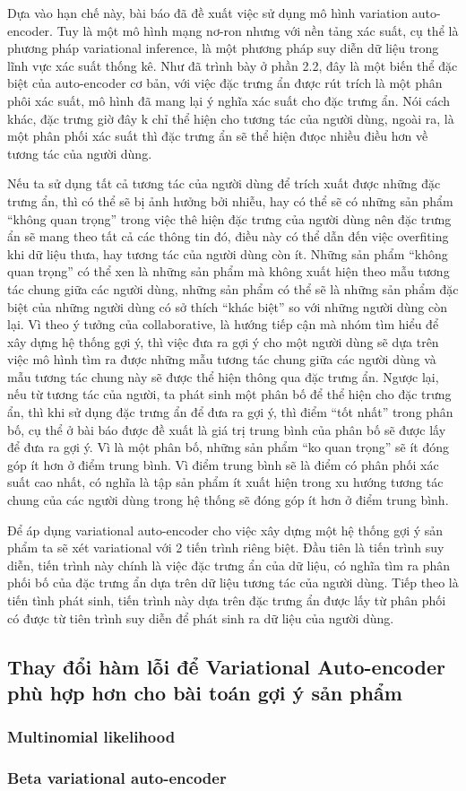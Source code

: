     Dựa vào hạn chế này, bài báo đã đề xuất việc sử dụng mô hình variation auto-encoder. 
    Tuy là một mô hình mạng nơ-ron nhưng với nền tảng xác suất, cụ thể là phương pháp variational inference, là một phương pháp suy diễn dữ liệu trong lĩnh vực xác suất thống kê.
    Như đã trình bày ở phần 2.2, đây là một biến thể đặc biệt của auto-encoder cơ bản, với việc đặc trưng ẩn được rút trích là một phân phôi xác suất, mô hình đã mang lại ý nghĩa xác suất cho đặc trưng ẩn.
    Nói cách khác, đặc trưng giờ đây k chỉ thể hiện cho tương tác của người dùng, ngoài ra, là một phân phối xác suất thì đặc trưng ẩn sẽ thể hiện đưọc nhiều điều hơn về tương tác của người dùng.


    Nếu ta sử dụng tất cả tương tác của người dùng để trích xuất được những đặc trưng ẩn, thì có thể sẽ bị ảnh hưởng bởi nhiễu, hay có thể sẽ có những sản phẩm ``không quan trọng'' trong việc thê hiện đặc trưng của người dùng nên đặc trưng ẩn sẽ mang theo tất cả các thông tin đó, điều này có thể dẫn đến việc overfiting khi dữ liệu thưa, hay tương tác của người dùng còn ít.
    Những sản phẩm ``không quan trọng'' có thể xen là những sản phẩm mà không xuất hiện theo mẫu tương tác chung giữa các người dùng, những sản phẩm có thể sẽ là những sản phẩm đặc biệt của những người dùng có sở thích ``khác biệt'' so với những người dùng còn lại. 
    Vì theo ý tưởng của collaborative, là hướng tiếp cận mà nhóm tìm hiểu để xây dựng hệ thống gợi ý, thì việc đưa ra gợi ý cho một người dùng sẽ dựa trên việc mô hình tìm ra được những mẫu tương tác chung giữa các người dùng và mẫu tương tác chung này sẽ được thể hiện thông qua đặc trưng ẩn.
    Ngược lại, nếu từ tương tác của người, ta phát sinh một phân bố để thể hiện cho đặc trưng ẩn, thì khi sử dụng đặc trưng ẩn để đưa ra gợi ý, thì điểm ``tốt nhất'' trong phân bố, cụ thể ở bài báo được đề xuất là giá trị trung bình của phân bố sẽ được lấy để đưa ra gợi ý.
    Vì là một phân bố, những sản phẩm ``ko quan trọng'' sẽ ít đóng góp ít hơn ở điểm trung bình. Vì điểm trung bình sẽ là điểm có phân phối xác suất cao nhất, có nghĩa là tập sản phẩm ít xuất hiện trong xu hướng tương tác chung của các người dùng trong hệ thống sẽ đóng góp ít hơn ở điểm trung bình.     

    
    Để áp dụng variational auto-encoder cho việc xây dựng một hệ thống gợi ý sản phẩm ta sẽ xét variational với 2 tiến trình riêng biệt. 
    Đầu tiên là tiến trình suy diễn, tiến trình này chính là việc đặc trưng ẩn của dữ liệu, có nghĩa tìm ra phân phối bố của đặc trưng ẩn dựa trên dữ liệu tương tác của người dùng.
    Tiếp theo là tiến tình phát sinh, tiến trình này dựa trên đặc trưng ẩn được lấy từ phân phối có được từ tiên trình suy diễn để phát sinh ra dữ liệu của người dùng.

    

    \subsection{Thay đổi hàm lỗi để Variational Auto-encoder phù hợp hơn cho bài toán gợi ý sản phẩm}

        \subsubsection{Multinomial likelihood}
        \subsubsection{Beta variational auto-encoder}
    
